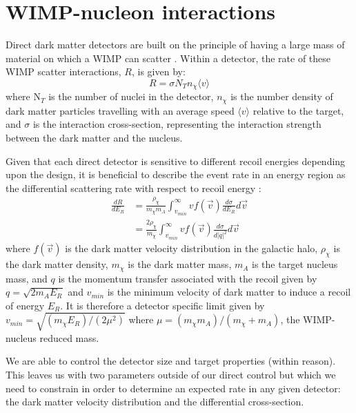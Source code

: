\section{WIMP-nucleon interactions} \label{sec:wimp_nucleus_interactions}

Direct dark matter detectors are built on the principle of having a large mass of material on which a WIMP can scatter \cite{direct_detection_of_wimps_ref}.
Within a detector, the rate of these WIMP scatter interactions, $R$, is given by:
\begin{equation}
    R = \sigma N_{T} n_{\chi} \langle v \rangle
    \label{eq:wimp_nucleon_rate}
\end{equation}
where N$_{T}$ is the number of nuclei in the detector, $n_\chi$ is the number density of dark matter particles travelling with an average speed $\langle v \rangle$ relative to the target, and $\sigma$ is the interaction cross-section, representing the interaction strength between the dark matter and the nucleus.
\par
Given that each direct detector is sensitive to different recoil energies depending upon the design, it is beneficial to describe the event rate in an energy region as the differential scattering rate with respect to recoil energy \cite{supersymetry_wimpy_boi_ref}:
\begin{equation}
\begin{split}
    \frac{dR}{dE_R} &= \frac{\rho_{\chi}}{m_\chi m_A} \int^{\infty}_{v_{min}} v f(\vec{v}) \frac{d\sigma}{dE_R} d\vec{v} \\
                    &= \frac{2\rho_{\chi}}{m_\chi} \int^{\infty}_{v_{min}} v f(\vec{v}) \frac{d\sigma}{d |q|^2} d\vec{v}
\end{split}
\label{eq:wimp_differential_rate}
\end{equation}
where $f(\vec{v})$ is the dark matter velocity distribution in the galactic halo, $\rho_{\chi}$ is the dark matter density, $m_\chi$ is the dark matter mass, $m_A$ is the target nucleus mass, and $q$ is the momentum transfer associated with the recoil given by $q = \sqrt{2m_A E_R}$ and $v_{min}$ is the minimum velocity of dark matter to induce a recoil of energy $E_R$.
It is therefore a detector specific limit given by $v_{min} = \sqrt{(m_\chi E_R)/(2\mu^2)}$ where $\mu = (m_\chi m_A)/(m_\chi + m_A)$, the WIMP-nucleus reduced mass.
\par
We are able to control the detector size and target properties (within reason).
This leaves us with two parameters outside of our direct control but which we need to constrain in order to determine an expected rate in any given detector: the dark matter velocity distribution and the differential cross-section.

